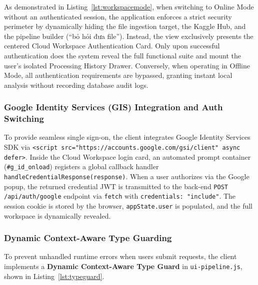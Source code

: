 As demonstrated in Listing~\ref{lst:workspacemode}, when switching to Online Mode without an authenticated session, the application enforces a strict security perimeter by dynamically hiding the file ingestion target, the Kaggle Hub, and the pipeline builder (``bỏ hỏi đưa file''). Instead, the view exclusively presents the centered Cloud Workspace Authentication Card. Only upon successful authentication does the system reveal the full functional suite and mount the user's isolated Processing History Drawer. Conversely, when operating in Offline Mode, all authentication requirements are bypassed, granting instant local analysis without recording database audit logs.

\subsubsection{Google Identity Services (GIS) Integration and Auth Switching}
To provide seamless single sign-on, the client integrates Google Identity Services SDK via \texttt{<script src="https://accounts.google.com/gsi/client" async defer>}. Inside the Cloud Workspace login card, an automated prompt container (\texttt{\#g\_id\_onload}) registers a global callback handler \texttt{handleCredentialResponse(response)}. When a user authorizes via the Google popup, the returned credential JWT is transmitted to the back-end \texttt{POST /api/auth/google} endpoint via \texttt{fetch} with \texttt{credentials: "include"}. The session cookie is stored by the browser, \texttt{appState.user} is populated, and the full workspace is dynamically revealed.

\subsubsection{Dynamic Context-Aware Type Guarding}
To prevent unhandled runtime errors when users submit requests, the client implements a \textbf{Dynamic Context-Aware Type Guard} in \texttt{ui-pipeline.js}, shown in Listing~\ref{lst:typeguard}.

